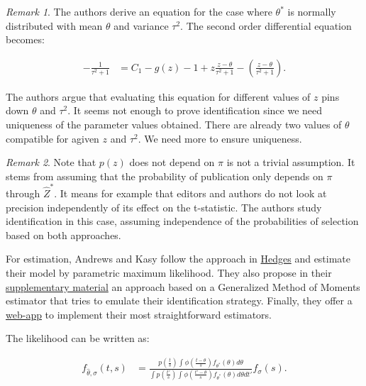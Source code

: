 \documentclass[
]{book}
\theoremstyle{definition}
\theoremstyle{definition}
\theoremstyle{definition}
\theoremstyle{definition}
\theoremstyle{remark}
\newtheorem*{remark}{Remark}
\begin{document}
\begin{remark}
\iffalse{} {Remark. } \fi{}The authors derive an equation for the case where \(\theta^*\) is normally distributed with mean \(\theta\) and variance \(\tau^2\).
The second order differential equation becomes:

\begin{align*}
  -\frac{1}{\tau^2+1} & = C_1-g(z)-1+z\frac{z-\theta}{\tau^2+1}-\left(\frac{z-\theta}{\tau^2+1}\right).
\end{align*}

The authors argue that evaluating this equation for different values of \(z\) pins down \(\theta\) and \(\tau^2\).
It seems not enough to prove identification since we need uniqueness of the parameter values obtained.
There are already two values of \(\theta\) compatible for agiven \(z\) and \(\tau^2\).
We need more to ensure uniqueness.
\end{remark}

\begin{remark}
\iffalse{} {Remark. } \fi{}Note that \(p(z)\) does not depend on \(\pi\) is not a trivial assumption.
It stems from assuming that the probability of publication only depends on \(\pi\) through \(\hat{Z}^*\).
It means for example that editors and authors do not look at precision independently of its effect on the t-statistic.
The authors study identification in this case, assuming independence of the probabilities of selection based on both approaches.
\end{remark}

For estimation, Andrews and Kasy follow the approach in \href{https://projecteuclid.org/euclid.ss/1177011364}{Hedges} and estimate their model by parametric maximum likelihood.
They also propose in their \href{https://www.aeaweb.org/content/file?id=10286}{supplementary material} an approach based on a Generalized Method of Moments estimator that tries to emulate their identification strategy.
Finally, they offer a \href{https://maxkasy.github.io/home/metastudy/}{web-app} to implement their most straightforward estimators.

The likelihood can be written as:

\begin{align*}
  f_{\hat{\theta},\hat{\sigma}}(t,s) & = \frac{p\left(\frac{t}{s}\right)\int\phi\left(\frac{t-\theta}{s}\right)f_{\theta^*}(\theta) d\theta}
                                              {\int p\left(\frac{t'}{s}\right)\int\phi\left(\frac{t'-\theta}{s}\right)f_{\theta^*}(\theta) d\theta dt'}f_{\sigma}(s).
\end{align*}
\end{document}
